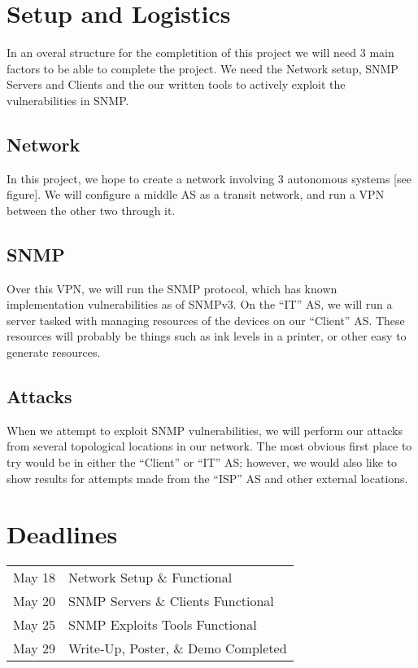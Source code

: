 \documentclass[11pt]{article}
\begin{document}
\section{Setup and Logistics}
In an overal structure for the completition of this project
we will need 3 main factors to be able to complete the project.
We need the Network setup, SNMP Servers and Clients and the
our written tools to actively exploit the vulnerabilities in
SNMP.

\subsection{Network}
In this project, we hope to create a network involving 3 autonomous 
systems [see figure].  We will configure a middle AS as a transit   %
network, and run a VPN between the other two through it.

\subsection{SNMP}
Over this VPN, we will run the SNMP protocol, which has known 
implementation vulnerabilities as of SNMPv3. On the “IT” AS, we will 
run a server tasked with managing resources of the devices on our 
“Client” AS.  These resources will probably be things such as ink 
levels in a printer, or other easy to generate resources.

\subsection{Attacks}
When we attempt to exploit SNMP vulnerabilities, we will perform our 
attacks from several topological locations in our network.  The most 
obvious first place to try would be in either the “Client” or “IT” AS; 
however, we would also like to show results for attempts made from 
the “ISP” AS and other external locations.

\section{Deadlines}

\begin{center}
\begin{tabular}{l l}
  May 18 & Network Setup \& Functional \\
  May 20 & SNMP Servers \& Clients Functional \\
  May 25 & SNMP Exploits Tools Functional \\
  May 29 & Write-Up, Poster, \& Demo Completed \\
\end{tabular}
\end{center}
\end{document}
